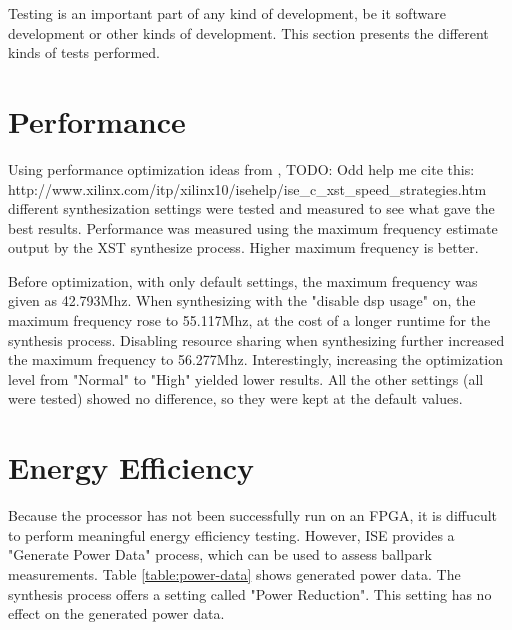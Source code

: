 Testing is an important part of any kind of development, be it software development or other kinds of development.
This section presents the different kinds of tests performed.

\section{Performance}

Using performance optimization ideas from \cite{xilinx-speed-strategies},
TODO: Odd help me cite this: http://www.xilinx.com/itp/xilinx10/isehelp/ise\_c\_xst\_speed\_strategies.htm
different synthesization settings were tested and measured to see what gave the best results.
Performance was measured using the maximum frequency estimate output by the XST synthesize process.
Higher maximum frequency is better.

Before optimization, with only default settings, the maximum frequency was given as 42.793Mhz.
When synthesizing with the "disable dsp usage" on, the maximum frequency rose to 55.117Mhz, at the cost of a longer runtime for the synthesis process.
Disabling resource sharing when synthesizing further increased the maximum frequency to 56.277Mhz.
Interestingly, increasing the optimization level from "Normal" to "High" yielded lower results.
All the other settings (all were tested) showed no difference, so they were kept at the default values.

\section{Energy Efficiency}

Because the processor has not been successfully run on an FPGA, it is diffucult to perform meaningful energy efficiency testing.
However, ISE provides a "Generate Power Data" process, which can be used to assess ballpark measurements.
Table \vref{table:power-data} shows generated power data.
The synthesis process offers a setting called "Power Reduction".
This setting has no effect on the generated power data.

